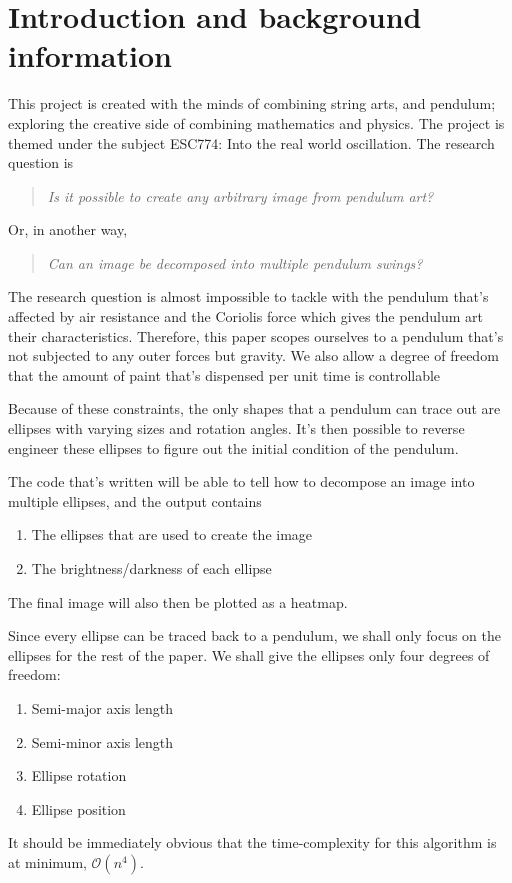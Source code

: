\section{Introduction and background information}

This project is created with the minds of combining string arts, and pendulum; exploring the creative side of combining mathematics and physics. The project is themed under the subject ESC774: Into the real world oscillation. The research question is
\begin{quote}
    \emph{Is it possible to create any arbitrary image from pendulum art?}
\end{quote}
Or, in another way,
\begin{quote}
    \emph{Can an image be decomposed into multiple pendulum swings?}
\end{quote}

The research question is almost impossible to tackle with the pendulum that's affected by air resistance and the Coriolis force which gives the pendulum art their characteristics. Therefore, this paper scopes ourselves to a pendulum that's not subjected to any outer forces but gravity. We also allow a degree of freedom that the amount of paint that's dispensed per unit time is controllable

Because of these constraints, the only shapes that a pendulum can trace out are ellipses with varying sizes and rotation angles. It's then possible to reverse engineer these ellipses to figure out the initial condition of the pendulum.

The code that's written will be able to tell how to decompose an image into multiple ellipses, and the output contains
\begin{enumerate}[noitemsep]
    \item The ellipses that are used to create the image
    \item The brightness/darkness of each ellipse
\end{enumerate}
The final image will also then be plotted as a heatmap.

Since every ellipse can be traced back to a pendulum, we shall only focus on the ellipses for the rest of the paper. We shall give the ellipses only four degrees of freedom:
\begin{enumerate}[noitemsep]
    \item Semi-major axis length
    \item Semi-minor axis length
    \item Ellipse rotation
    \item Ellipse position
\end{enumerate}
It should be immediately obvious that the time-complexity for this algorithm is at minimum, $\mathcal{O}(n^4)$.

